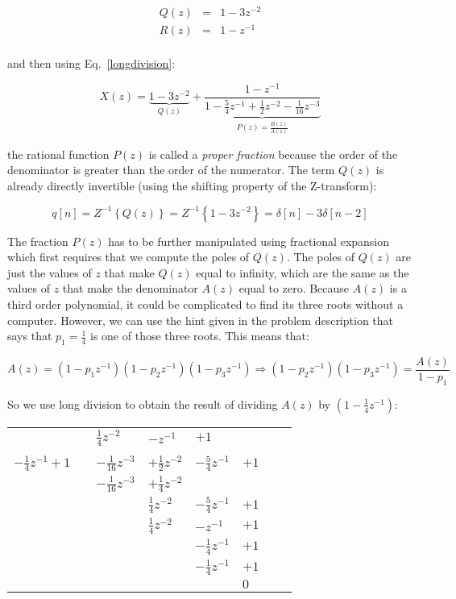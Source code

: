 \documentclass[a4paper,12pt,oneside]{article}
\begin{document}
\[
\begin{array}{lll}
Q(z)&=&1-3z^{-2}\\
R(z)&=&1-z^{-1}\\
\end{array}
\]

and then using Eq.~\ref{longdivision}:

\begin{equation}\label{eq2}
X(z)=\underbrace{1-3z^{-2}}_{Q(z)}+\underbrace{\frac{1-z^{-1}}{1-\frac{5}{4}z^{-1}+\frac{1}{2}z^{-2}-\frac{1}{16}z^{-3}}}_{P(z)=\frac{B(z)}{A(z)}}
\end{equation}

the rational function $P(z)$ is called a \emph{proper fraction} because the order of the denominator is greater than the order of the numerator. The term $Q(z)$ is already directly invertible (using the shifting property of the Z-transform):

\[
q[n]=Z^{-1}\left\{Q(z)\right\}=Z^{-1}\left\{1-3z^{-2}\right\}=\delta[n]-3\delta[n-2]
\]

The fraction $P(z)$ has to be further manipulated using fractional expansion which first requires that we compute the poles of $Q(z)$. The poles of $Q(z)$ are just the values of $z$ that make $Q(z)$ equal to infinity, which are the same as the values of $z$ that make the denominator $A(z)$ equal to zero. Because $A(z)$ is a third order polynomial, it could be complicated to find its three roots without a computer. However, we can use the hint given in the problem description that says that $p_1=\frac{1}{4}$ is one of those three roots. This means that:

\[
A(z)=(1-p_{1}z^{-1})(1-p_{2}z^{-1})(1-p_{3}z^{-1})\Rightarrow (1-p_{2}z^{-1})(1-p_{3}z^{-1})=\frac{A(z)}{1-p_1}
\]

So we use long division to obtain the result of dividing $A(z)$ by $(1-\frac{1}{4}z^{-1})$:

\begin{tabular}{r|cllllll}
&\qquad&$\frac{1}{4}z^{-2}$&$-z^{-1}$&$+1$&&&\\
\cline{2-8}
\\
$-\frac{1}{4}z^{-1}+1$&&$-\frac{1}{16}z^{-3}$&$+\frac{1}{2}z^{-2}$&$-\frac{5}{4}z^{-1}$&$+1$&&\\
&&$-\frac{1}{16}z^{-3}$&$+\frac{1}{4}z^{-2}$&&&&\\
\cline{3-8}
&&&$\frac{1}{4}z^{-2}$&$-\frac{5}{4}z^{-1}$&$+1$&&\\
&&&$\frac{1}{4}z^{-2}$&$-z^{-1}$&$+1$&&\\
\cline{4-8}
&&&&$-\frac{1}{4}z^{-1}$&$+1$&&\\
&&&&$-\frac{1}{4}z^{-1}$&$+1$&&\\
\cline{5-8}
&&&&&$0$&&\\
\end{tabular}
\end{document}
